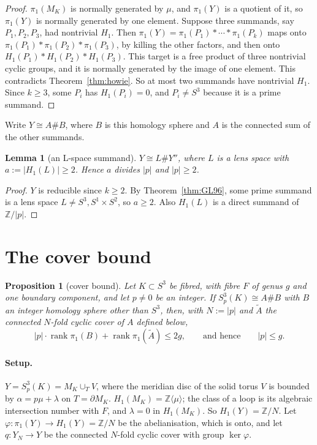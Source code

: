 \documentclass[11pt]{article}
\newtheorem{proposition}[theorem]{Proposition}
\newtheorem{lemma}[theorem]{Lemma}
\theoremstyle{definition}
\newcommand{\Z}{\mathbb{Z}}
\newcommand{\rk}{\operatorname{rank}}
\begin{document}

\begin{proof}
$\pi_1(M_K)$ is normally generated by $\mu$, and $\pi_1(Y)$ is a quotient of it, so $\pi_1(Y)$ is normally generated by one element. Suppose three summands, say $P_1,P_2,P_3$, had nontrivial $H_1$. Then $\pi_1(Y)=\pi_1(P_1)*\cdots*\pi_1(P_k)$ maps onto $\pi_1(P_1)*\pi_1(P_2)*\pi_1(P_3)$, by killing the other factors, and then onto $H_1(P_1)*H_1(P_2)*H_1(P_3)$. This target is a free product of three nontrivial cyclic groups, and it is normally generated by the image of one element. This contradicts Theorem~\ref{thm:howie}. So at most two summands have nontrivial $H_1$. Since $k\ge3$, some $P_i$ has $H_1(P_i)=0$, and $P_i\ne S^3$ because it is a prime summand.
\end{proof}


Write $Y\cong A\#B$, where $B$ is this homology sphere and $A$ is the connected sum of the other summands.

\begin{lemma}[an L-space summand]\label{lem:lens}
$Y\cong L\#Y''$, where $L$ is a lens space with $a:=|H_1(L)|\ge2$. Hence $a$ divides $|p|$ and $|p|\ge2$.
\end{lemma}

\begin{proof}
$Y$ is reducible since $k\ge 2$. By Theorem~\ref{thm:GL96}, some prime summand is a lens space $L\ne S^3,S^1\times S^2$, so $a\ge2$. Also $H_1(L)$ is a direct summand of $\Z/|p|$.
\end{proof}

\section{The cover bound}\label{sec:cover}

\begin{proposition}[cover bound]\label{prop:cover}
Let $K\subset S^3$ be fibred, with fibre $F$ of genus $g$ and one boundary component, and let $p\ne0$ be an integer. If $S^3_p(K)\cong A\#B$ with $B$ an integer homology sphere other than $S^3$, then, with $N:=|p|$ and $\tilde A$ the connected $N$-fold cyclic cover of $A$ defined below,
\[
|p|\cdot\rk\pi_1(B)+\rk\pi_1(\tilde A)\le 2g,\qquad\text{and hence}\qquad |p|\le g.
\]
\end{proposition}

\paragraph{Setup.} $Y=S^3_p(K)=M_K\cup_T V$, where the meridian disc of the solid torus $V$ is bounded by $\alpha=p\mu+\lambda$ on $T=\partial M_K$. $H_1(M_K)=\Z\langle\mu\rangle$; the class of a loop is its algebraic intersection number with $F$, and $\lambda=0$ in $H_1(M_K)$. So $H_1(Y)=\Z/N$. Let $\varphi\colon\pi_1(Y)\to H_1(Y)=\Z/N$ be the abelianisation, which is onto, and let $q\colon Y_N\to Y$ be the connected $N$-fold cyclic cover with group $\ker\varphi$.
\end{document}
